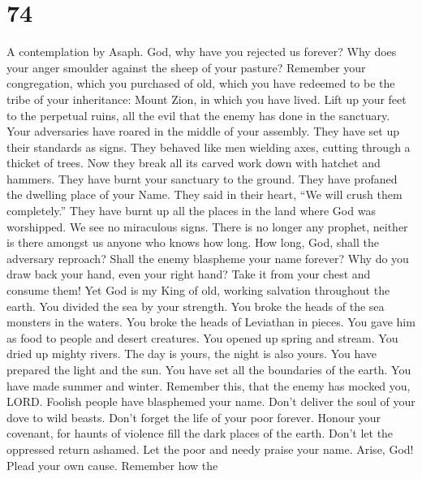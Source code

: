 \hypertarget{section-72}{%
\section{74}\label{section-72}}

A contemplation by Asaph.  God, why have you rejected us
forever? Why does your anger smoulder against the sheep of your pasture?
 Remember your congregation, which you purchased of old,
which you have redeemed to be the tribe of your inheritance: Mount Zion,
in which you have lived.  Lift up your feet to the
perpetual ruins, all the evil that the enemy has done in the sanctuary.
 Your adversaries have roared in the middle of your
assembly. They have set up their standards as signs.  They
behaved like men wielding axes, cutting through a thicket of trees.
 Now they break all its carved work down with hatchet and
hammers.  They have burnt your sanctuary to the ground.
They have profaned the dwelling place of your Name.  They
said in their heart, ``We will crush them completely.'' They have burnt
up all the places in the land where God was worshipped. 
We see no miraculous signs. There is no longer any prophet, neither is
there amongst us anyone who knows how long.  How long,
God, shall the adversary reproach? Shall the enemy blaspheme your name
forever?  Why do you draw back your hand, even your right
hand? Take it from your chest and consume them!  Yet God
is my King of old, working salvation throughout the earth.
 You divided the sea by your strength. You broke the
heads of the sea monsters in the waters.  You broke the
heads of Leviathan in pieces. You gave him as food to people and desert
creatures.  You opened up spring and stream. You dried up
mighty rivers.  The day is yours, the night is also
yours. You have prepared the light and the sun.  You have
set all the boundaries of the earth. You have made summer and winter.
 Remember this, that the enemy has mocked you, LORD.
Foolish people have blasphemed your name.  Don't deliver
the soul of your dove to wild beasts. Don't forget the life of your poor
forever.  Honour your covenant, for haunts of violence
fill the dark places of the earth.  Don't let the
oppressed return ashamed. Let the poor and needy praise your name.
 Arise, God! Plead your own cause. Remember how the
